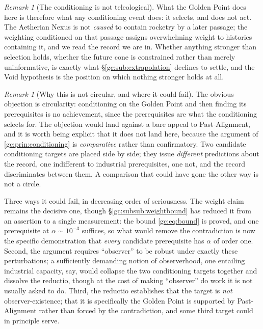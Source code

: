 \documentclass[11pt]{article}
\numberwithin{equation}{section}
\theoremstyle{plain}
\theoremstyle{definition}
\theoremstyle{remark}
\newtheorem{remark}[theorem]{Remark}
\begin{document}
\begin{remark}[The conditioning is not teleological]
What the Golden Point does here is therefore what any conditioning event
does: it selects, and does not act. The Aetherian Nexus is not
\emph{caused} to contain rocketry by a later passage; the weighting
conditioned on that passage assigns overwhelming weight to histories
containing it, and we read the record we are in. Whether anything
stronger than selection holds, whether the future cone is constrained
rather than merely uninformative, is exactly what
\S\ref{gc:sub:extrapolation} declines to settle, and the Void hypothesis
is the position on which nothing stronger holds at all.
\end{remark}

\begin{remark}[Why this is not circular, and where it could fail]
\label{gc:rem:circularity}
The obvious objection is circularity: conditioning on the Golden Point
and then finding its prerequisites is no achievement, since the
prerequisites are what the conditioning selects for. The objection would
land against a bare appeal to Past-Alignment, and it is worth being
explicit that it does not land here, because the argument of
\ref{gc:prin:conditioning} is \emph{comparative} rather than
confirmatory. Two candidate conditioning targets are placed side by
side; they issue \emph{different} predictions about the record, one
indifferent to industrial prerequisites, one not, and the record
discriminates between them. A comparison that could have gone the other
way is not a circle.

Three ways it could fail, in decreasing order of seriousness. The weight claim remains the decisive one, though
\S\ref{gc:subsub:weightbound} has reduced it from an assertion to a
single measurement: the bound \eqref{gc:eq:bound} is proved, and one
prerequisite at $\alpha\sim10^{-3}$ suffices, so what would remove the
contradiction is now the specific demonstration that \emph{every}
candidate prerequisite has $\alpha$ of order one. Second, the
argument requires ``observer'' to be robust under exactly these
perturbations; a sufficiently demanding notion of observerhood, one
entailing industrial capacity, say, would collapse the two
conditioning targets together and dissolve the reductio, though at the
cost of making ``observer'' do work it is not usually asked to do.
Third, the reductio establishes that the target is \emph{not}
observer-existence; that it is specifically the Golden Point is
supported by Past-Alignment rather than forced by the contradiction, and
some third target could in principle serve.
\end{remark}
\end{document}
